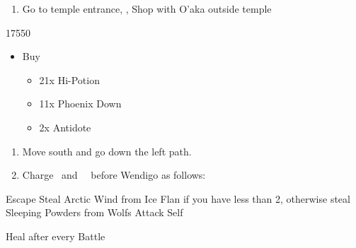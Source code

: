 \begin{enumerate}[resume]
	\item Go to temple entrance, \sd, Shop with O'aka outside temple
\end{enumerate}
\begin{shop}{17550}
	\begin{itemize}
		\item Buy
			\begin{itemize}
				\item 21x Hi-Potion
				\item 11x Phoenix Down
				\item 2x Antidote
			\end{itemize}
	\end{itemize}
\end{shop}
\begin{enumerate}[resume]
	\item Move south and go down the left path.
	\item Charge \rikku\ and \yuna\ \od\ before Wendigo as follows:
\end{enumerate}
\begin{encounters}
	\begin{itemize}
		\tidusf Escape
		\rikkuf Steal Arctic Wind from Ice Flan if you have less than 2, otherwise steal Sleeping Powders from Wolfs
		\yunaf Attack Self
	\end{itemize}
	Heal after every Battle
\end{encounters}
